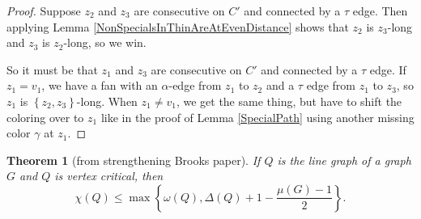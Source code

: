 \documentclass[12pt]{amsart}
\theoremstyle{plain}
\newtheorem{thm}{Theorem}
\theoremstyle{definition}
\theoremstyle{remark}
\newcommand{\set}[1]{\left\{ #1 \right\}}
\begin{document}
\begin{proof}
Suppose $z_2$ and $z_3$ are consecutive on $C'$ and connected by a $\tau$ edge.  Then applying Lemma \ref{NonSpecialsInThinAreAtEvenDistance} shows that $z_2$ is $z_3$-long and $z_3$ is $z_2$-long, so we win.

So it must be that $z_1$ and $z_3$ are consecutive on $C'$ and connected by a $\tau$ edge.  If $z_1 = v_1$, we have a fan with an $\alpha$-edge from $z_1$ to $z_2$ and a $\tau$ edge from $z_1$ to $z_3$, so 
$z_1$ is $\set{z_2,z_3}$-long.  When $z_1 \ne v_1$, we get the same thing, but have to shift the coloring over to $z_1$ like in the proof of Lemma \ref{SpecialPath} using another missing color $\gamma$ at $z_1$.
\end{proof}

\begin{thm}[from strengthening Brooks paper]\label{CriticalMuBound}
If $Q$ is the line graph of a graph $G$ and $Q$ is vertex critical, then
\[\chi(Q) \leq \max\left\{\omega(Q), \Delta(Q) + 1 - \frac{\mu(G) - 1}{2}\right\}.\]
\end{thm}
\end{document}
